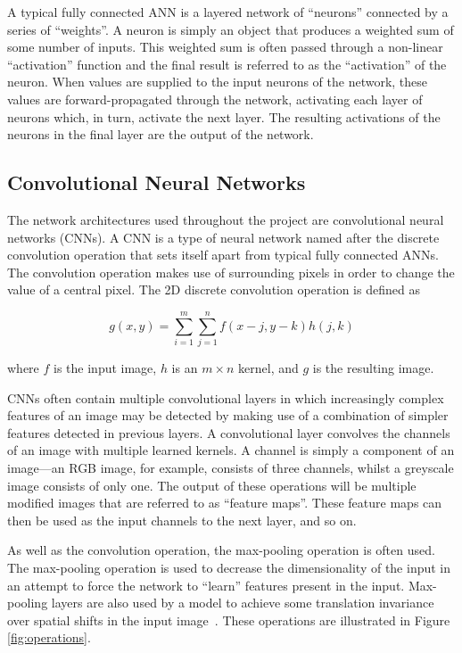 A typical fully connected ANN is a layered network of ``neurons'' connected by a series of ``weights''. A neuron is simply an object that produces a weighted sum of some number of inputs. This weighted sum is often passed through a non-linear ``activation'' function and the final result is referred to as the ``activation'' of the neuron. When values are supplied to the input neurons of the network, these values are forward-propagated through the network, activating each layer of neurons which, in turn, activate the next layer. The resulting activations of the neurons in the final layer are the output of the network.

\subsection{Convolutional Neural Networks}

The network architectures used throughout the project are convolutional neural networks (CNNs). A CNN is a type of neural network named after the discrete convolution operation that sets itself apart from typical fully connected ANNs. The convolution operation makes use of surrounding pixels in order to change the value of a central pixel. The 2D discrete convolution operation is defined as

\begin{equation}
    g(x,y)=\sum_{i=1}^{m}\sum_{j=1}^{n}f(x-j,y-k)h(j,k)
\end{equation}

\noindent
where $f$ is the input image, $h$ is an $m\times n$ kernel, and $g$ is the resulting image.

CNNs often contain multiple convolutional layers in which increasingly complex features of an image may be detected by making use of a combination of simpler features detected in previous layers. A convolutional layer convolves the channels of an image with multiple learned kernels. A channel is simply a component of an image---an RGB image, for example, consists of three channels, whilst a greyscale image consists of only one. The output of these operations will be multiple modified images that are referred to as ``feature maps''. These feature maps can then be used as the input channels to the next layer, and so on.

As well as the convolution operation, the max-pooling operation is often used. The max-pooling operation is used to decrease the dimensionality of the input in an attempt to force the network to ``learn'' features present in the input. Max-pooling layers are also used by a model to achieve some translation invariance over spatial shifts in the input image~\cite{segnet}. These operations are illustrated in Figure \ref{fig:operations}.

